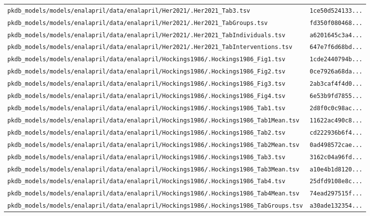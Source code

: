 \documentclass{article}
\begin{document}
\begin{longtable}{ll}
\texttt{pkdb\_models/models/enalapril/data/enalapril/Her2021/.Her2021\_Tab3.tsv} & \texttt{1ce50d524133...} \\
\texttt{pkdb\_models/models/enalapril/data/enalapril/Her2021/.Her2021\_TabGroups.tsv} & \texttt{fd350f080468...} \\
\texttt{pkdb\_models/models/enalapril/data/enalapril/Her2021/.Her2021\_TabIndividuals.tsv} & \texttt{a6201645c3a4...} \\
\texttt{pkdb\_models/models/enalapril/data/enalapril/Her2021/.Her2021\_TabInterventions.tsv} & \texttt{647e7f6d68bd...} \\
\texttt{pkdb\_models/models/enalapril/data/enalapril/Hockings1986/.Hockings1986\_Fig1.tsv} & \texttt{1cde2440794b...} \\
\texttt{pkdb\_models/models/enalapril/data/enalapril/Hockings1986/.Hockings1986\_Fig2.tsv} & \texttt{0ce7926a68da...} \\
\texttt{pkdb\_models/models/enalapril/data/enalapril/Hockings1986/.Hockings1986\_Fig3.tsv} & \texttt{2ab3caf4f4d0...} \\
\texttt{pkdb\_models/models/enalapril/data/enalapril/Hockings1986/.Hockings1986\_Fig4.tsv} & \texttt{6e53b9fd7855...} \\
\texttt{pkdb\_models/models/enalapril/data/enalapril/Hockings1986/.Hockings1986\_Tab1.tsv} & \texttt{2d8f0c0c98ac...} \\
\texttt{pkdb\_models/models/enalapril/data/enalapril/Hockings1986/.Hockings1986\_Tab1Mean.tsv} & \texttt{11622ac490c8...} \\
\texttt{pkdb\_models/models/enalapril/data/enalapril/Hockings1986/.Hockings1986\_Tab2.tsv} & \texttt{cd222936b6f4...} \\
\texttt{pkdb\_models/models/enalapril/data/enalapril/Hockings1986/.Hockings1986\_Tab2Mean.tsv} & \texttt{0ad498572cae...} \\
\texttt{pkdb\_models/models/enalapril/data/enalapril/Hockings1986/.Hockings1986\_Tab3.tsv} & \texttt{3162c04a96fd...} \\
\texttt{pkdb\_models/models/enalapril/data/enalapril/Hockings1986/.Hockings1986\_Tab3Mean.tsv} & \texttt{a10e4b1d8120...} \\
\texttt{pkdb\_models/models/enalapril/data/enalapril/Hockings1986/.Hockings1986\_Tab4.tsv} & \texttt{25dfd9108e8c...} \\
\texttt{pkdb\_models/models/enalapril/data/enalapril/Hockings1986/.Hockings1986\_Tab4Mean.tsv} & \texttt{74ead297515f...} \\
\texttt{pkdb\_models/models/enalapril/data/enalapril/Hockings1986/.Hockings1986\_TabGroups.tsv} & \texttt{a30ade132354...} \\

\end{longtable}
\end{document}
